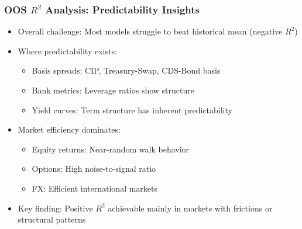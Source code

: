 \documentclass[ignorenonframetext, 9pt]{beamer}
\begin{document}
\begin{frame}
  \frametitle{OOS $R^2$ Analysis: Predictability Insights}
  \begin{itemize}
  \item \alert{Overall challenge:} Most models struggle to beat historical mean (negative $R^2$)
  \vspace{0.3cm}
  \item \alert{Where predictability exists:}
  \begin{itemize}
    \item Basis spreads: CIP, Treasury-Swap, CDS-Bond basis
    \item Bank metrics: Leverage ratios show structure
    \item Yield curves: Term structure has inherent predictability
  \end{itemize}
  \vspace{0.3cm}
  \item \alert{Market efficiency dominates:}
  \begin{itemize}
    \item Equity returns: Near-random walk behavior
    \item Options: High noise-to-signal ratio
    \item FX: Efficient international markets
  \end{itemize}
  \vspace{0.3cm}
  \item \alert{Key finding:} Positive $R^2$ achievable mainly in markets with frictions or structural patterns
  \end{itemize}
\end{frame}
\end{document}
